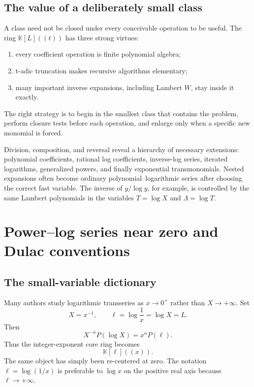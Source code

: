 \documentclass[11pt,openany]{book}
\theoremstyle{definition}
\theoremstyle{plain}
\theoremstyle{remark}
\newcommand{\K}{\mathbb{K}}
\begin{document}
\section{The value of a deliberately small class}
A class need not be closed under every conceivable operation to be useful.
The ring \(\K[L]((t))\) has three strong virtues:
\begin{enumerate}
\item every coefficient operation is finite polynomial algebra;
\item t-adic truncation makes recursive algorithms elementary;
\item many important inverse expansions, including Lambert \(W\), stay inside
      it exactly.
\end{enumerate}
The right strategy is to begin in the smallest class that contains the problem,
perform closure tests before each operation, and enlarge only when a specific
new monomial is forced.

\begin{summarybox}
Division, composition, and reversal reveal a hierarchy of necessary
extensions: polynomial coefficients, rational log coefficients, inverse-log
series, iterated logarithms, generalized powers, and finally exponential
transmonomials.  Nested expansions often become ordinary polynomial--logarithmic
series after choosing the correct fast variable.  The inverse of \(y/\log y\),
for example, is controlled by the same Lambert polynomials in the variables
\(T=\log X\) and \(\Lambda=\log T\).
\end{summarybox}

\chapter{Power--log series near zero and Dulac conventions}\label{ch:dulac}

\section{The small-variable dictionary}
Many authors study logarithmic transseries as \(x\to0^+\) rather than
\(X\to+\infty\).  Set
\begin{equation}\label{eq:small-dictionary}
 X=x^{-1},
 \qquad
 \ell=\log\frac1x=\log X=L.
\end{equation}
Then
\[
 X^{-n}P(\log X)=x^nP(\ell).
\]
Thus the integer-exponent core ring becomes
\begin{equation}\label{eq:small-ring}
 \K[\ell]((x)).
\end{equation}
The same object has simply been re-centered at zero.  The notation
\(\ell=\log(1/x)\) is preferable to \(\log x\) on the positive real axis because
\(\ell\to+\infty\).
\end{document}
